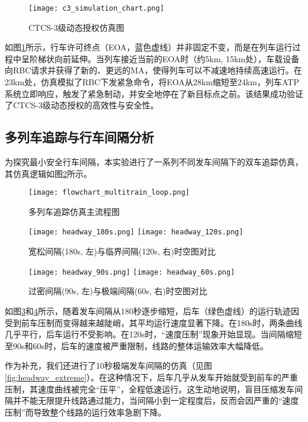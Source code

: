 \documentclass[11pt, a4paper]{ctexart}
\begin{document}
\begin{figure}[h!]
    \centering
    \texttt{[image: c3\_simulation\_chart.png]}
    \caption{CTCS-3级动态授权仿真图}
    \label{fig:c3_simulation}
\end{figure}

如图\ref{fig:c3_simulation}所示，行车许可终点（EOA，蓝色虚线）并非固定不变，而是在列车运行过程中呈阶梯状向前延伸。当列车接近当前的EOA时（约5km, 15km处），车载设备向RBC请求并获得了新的、更远的MA，使得列车可以不减速地持续高速运行。在23km处，仿真模拟了RBC下发紧急命令，将EOA从28km缩短至24km，列车ATP系统立即响应，触发了紧急制动，并安全地停在了新目标点之前。该结果成功验证了CTCS-3级动态授权的高效性与安全性。

\subsection{多列车追踪与行车间隔分析}
为探究最小安全行车间隔，本实验进行了一系列不同发车间隔下的双车追踪仿真，其仿真逻辑如图\ref{fig:multitrain_loop}所示。

\begin{figure}[h!]
    \centering
    \texttt{[image: flowchart\_multitrain\_loop.png]}
    \caption{多列车追踪仿真主流程图}
    \label{fig:multitrain_loop}
\end{figure}

\begin{figure}[h!]
    \centering
    \texttt{[image: headway\_180s.png]}
    \hfill
    \texttt{[image: headway\_120s.png]}
    \caption{宽松间隔(180s, 左)与临界间隔(120s, 右)时空图对比}
    \label{fig:headway_compare1}
\end{figure}

\begin{figure}[h!]
    \centering
    \texttt{[image: headway\_90s.png]}
    \hfill
    \texttt{[image: headway\_60s.png]}
    \caption{过密间隔(90s, 左)与极端间隔(60s, 右)时空图对比}
    \label{fig:headway_compare2}
\end{figure}

如图\ref{fig:headway_compare1}和\ref{fig:headway_compare2}所示，随着发车间隔从180秒逐步缩短，后车（绿色虚线）的运行轨迹因受到前车压制而变得越来越陡峭，其平均运行速度显著下降。在180s时，两条曲线几乎平行，后车运行不受影响。在120s时，“速度压制”现象开始显现。当间隔缩短至90s和60s时，后车的速度被严重限制，线路的整体运输效率大幅降低。

作为补充，我们还进行了10秒极端发车间隔的仿真（见图\ref{fig:headway_extreme}）。在这种情况下，后车几乎从发车开始就受到前车的严重压制，其速度曲线被完全“压平”，全程低速运行。这生动地说明，盲目压缩发车间隔并不能无限提升线路通过能力，当间隔小到一定程度后，反而会因严重的“速度压制”而导致整个线路的运行效率急剧下降。
\end{document}

